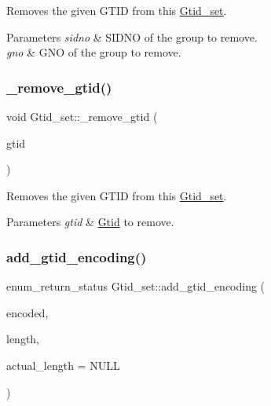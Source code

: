 Removes the given G\+T\+ID from this \mbox{\hyperlink{classGtid__set}{Gtid\+\_\+set}}.


\begin{DoxyParams}{Parameters}
{\em sidno} & S\+I\+D\+NO of the group to remove. \\
\hline
{\em gno} & G\+NO of the group to remove. \\
\hline
\end{DoxyParams}
\mbox{\label{classGtid__set_add6998be8ef93e04caca93692e755826}} 
\subsubsection{\texorpdfstring{\+\_\+remove\+\_\+gtid()}{\_remove\_gtid()}\hspace{0.1cm}{\footnotesize\ttfamily [2/2]}}
{\footnotesize\ttfamily void Gtid\+\_\+set\+::\+\_\+remove\+\_\+gtid (\begin{DoxyParamCaption}\item[{const \mbox{\hyperlink{structGtid}{Gtid}} \&}]{gtid }\end{DoxyParamCaption})\hspace{0.3cm}{\ttfamily [inline]}}

Removes the given G\+T\+ID from this \mbox{\hyperlink{classGtid__set}{Gtid\+\_\+set}}.


\begin{DoxyParams}{Parameters}
{\em gtid} & \mbox{\hyperlink{structGtid}{Gtid}} to remove. \\
\hline
\end{DoxyParams}
\mbox{\label{classGtid__set_ae5f1bc4e5fa45a2902ff562df316cf1b}} 
\subsubsection{\texorpdfstring{add\+\_\+gtid\+\_\+encoding()}{add\_gtid\_encoding()}}
{\footnotesize\ttfamily enum\+\_\+return\+\_\+status Gtid\+\_\+set\+::add\+\_\+gtid\+\_\+encoding (\begin{DoxyParamCaption}\item[{const uchar $\ast$}]{encoded,  }\item[{size\+\_\+t}]{length,  }\item[{size\+\_\+t $\ast$}]{actual\+\_\+length = {\ttfamily NULL} }\end{DoxyParamCaption})}

